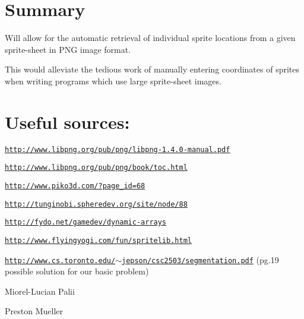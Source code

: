 \hypertarget{main_sum_sec}{}\section{Summary}\label{main_sum_sec}
Will allow for the automatic retrieval of individual sprite locations from a given sprite-\/sheet in PNG image format. \par
 This would alleviate the tedious work of manually entering coordinates of sprites when writing programs which use large sprite-\/sheet images.\hypertarget{main_srcs}{}\section{Useful sources:}\label{main_srcs}

\begin{DoxyItemize}
\item \href{http://www.libpng.org/pub/png/libpng-1.4.0-manual.pdf}{\tt http://www.libpng.org/pub/png/libpng-\/1.4.0-\/manual.pdf}  
\item \href{http://www.libpng.org/pub/png/book/toc.html}{\tt http://www.libpng.org/pub/png/book/toc.html}  
\item \href{http://www.piko3d.com/?page_id=68}{\tt http://www.piko3d.com/?page\_\-id=68}  
\item \href{http://tunginobi.spheredev.org/site/node/88}{\tt http://tunginobi.spheredev.org/site/node/88}  
\item \href{http://fydo.net/gamedev/dynamic-arrays}{\tt http://fydo.net/gamedev/dynamic-\/arrays}  
\item \href{http://www.flyingyogi.com/fun/spritelib.html}{\tt http://www.flyingyogi.com/fun/spritelib.html}  
\item \href{http://www.cs.toronto.edu/~jepson/csc2503/segmentation.pdf}{\tt http://www.cs.toronto.edu/$\sim$jepson/csc2503/segmentation.pdf} (pg.19 possible solution for our basic problem)  
\item Miorel-\/Lucian Palii  
\item Preston Mueller  
\end{DoxyItemize}